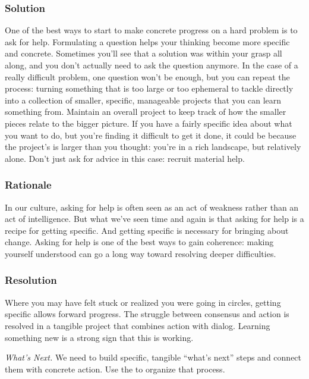 \subsubsection*{Solution} 
One of the best ways to start to make concrete progress on a hard problem is to ask for help.   Formulating a question helps your thinking become more specific and concrete.  Sometimes you'll see that a solution was within your grasp all along, and you don't actually need to ask the question anymore.  In the case of a really difficult problem, one question won't be enough, but you can repeat the process: turning something that is too large or too ephemeral to tackle directly into a collection of smaller, specific, manageable projects that you can learn something from.  Maintain an overall project  to keep track of how the smaller pieces relate to the bigger picture.  If you have a fairly specific idea about what you want to do, but you're finding it difficult to get it done, it could be because the project's  is larger than you thought: you're in a rich landscape, but relatively alone.  Don't just ask for advice in this case: recruit material help.

\subsubsection*{Rationale} 
In our culture, asking for help is often seen as an act of weakness rather than an act of intelligence.
But what we've seen time and again is that asking for help is a recipe for getting specific.
And getting specific is necessary for bringing about change.  Asking for help is one
of the best ways to gain coherence: making yourself understood can go a long way
toward resolving deeper difficulties.  

\subsubsection*{Resolution}
Where you may have felt stuck or realized you were going in circles, getting specific allows forward progress.  The struggle between consensus and action is resolved in a tangible project that combines action with dialog.  Learning something new is a strong sign that this is working.

\begin{framed}
\emph{What's Next.}
We need to build specific, tangible ``what's next'' steps and connect them with concrete action. Use the  to organize that process. 
\end{framed}

